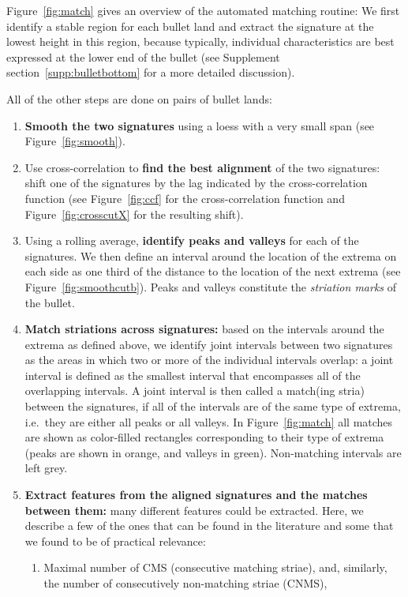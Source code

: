 \documentclass[aoas, preprint]{imsart}\usepackage[]{graphicx}\usepackage[]{color}
\begin{document}
Figure~\ref{fig:match} gives an overview of the automated matching routine: 
We first identify a stable region for each bullet land and extract the signature at the lowest height in this region, because typically, individual characteristics are best expressed at the lower end of the bullet (see Supplement section~\ref{supp:bulletbottom} for a more detailed discussion). 

All of the other steps are done on pairs of bullet lands:
\begin{enumerate}
\item {\bf Smooth the two signatures} using a loess with a very small span (see Figure~\ref{fig:smooth}). 
\item Use cross-correlation to {\bf find the best alignment} of the two signatures: shift one of the signatures by the lag indicated by the cross-correlation function (see Figure~\ref{fig:ccf} for the cross-correlation function and Figure~\ref{fig:crosscutX} for the resulting shift).
\item Using a rolling average, {\bf identify peaks and valleys} for each of the signatures. We then define an interval around the location of the extrema on each side as one third of the distance to the location of the next extrema (see Figure~\ref{fig:smoothcutb}). Peaks and valleys constitute the \emph{striation marks} of the bullet.
\item {\bf Match striations across signatures:} based on the intervals around the extrema as defined above, we identify joint intervals between two signatures as the areas in which two or more of the individual intervals overlap: a joint interval is defined as the smallest interval that encompasses all of the overlapping intervals. A joint interval is then called a match(ing stria) between the signatures, if all of the intervals are of the same type of extrema, i.e.\ they are either all peaks or all valleys. In Figure~\ref{fig:match} all matches are shown as color-filled rectangles corresponding to their type of extrema (peaks are shown in orange, and valleys in green). Non-matching intervals are left grey. 
\item {\bf Extract features from the aligned signatures and the matches between them:} many different features could be extracted. Here, we describe a few of the ones that can be found in the literature and some that we found to be of practical relevance:
\begin{enumerate}[label=(\roman*)]
\item Maximal number of CMS (consecutive matching striae), and, similarly, the number of consecutively non-matching striae (CNMS), 

\end{enumerate}
\end{enumerate}
\end{document}
